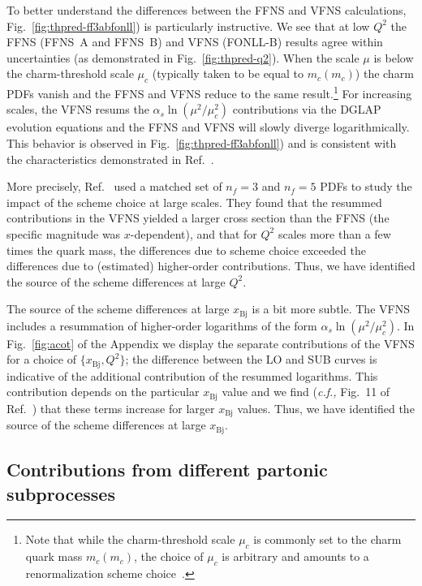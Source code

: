 \documentclass[pdftex,twocolumn,epjc3]{svjour3}          %
\newcommand{\xbj}{\ensuremath{x_{\text{Bj}}}\xspace}
\newcommand{\fonll} {{FONLL-B}\xspace}
\newcommand{\ffns} {{FFNS~A}\xspace}
\newcommand{\ffnsb} {{FFNS~B}\xspace}
\begin{document}
%
To better understand the differences between the FFNS and VFNS
calculations, Fig.~\ref{fig:thpred-ff3abfonll}) is particularly
instructive.
%
We see that at low $Q^2$ the FFNS (\ffns and \ffnsb) and VFNS
(\fonll) results agree within uncertainties (as demonstrated in 
Fig.~\ref{fig:thpred-q2}). When the scale $\mu$ is
below the charm-threshold scale $\mu_c$ (typically taken to be equal
to $m_c(m_c)$) the charm PDFs vanish and the FFNS and VFNS reduce to
the same result.\footnote{Note that while the charm-threshold scale
  $\mu_c$ is commonly set to the charm quark mass $m_c(m_c)$, the
  choice of $\mu_c$ is arbitrary and amounts to a renormalization
  scheme choice~\cite{Bertone:2017ehk}.}
%
For increasing scales, the VFNS resums the $\alpha_s\ln(\mu^2/\mu_c^2)$
contributions via the DGLAP evolution equations and the FFNS and VFNS
will slowly diverge logarithmically. This behavior is observed in
\hbox{Fig.~\ref{fig:thpred-ff3abfonll})} and is consistent with the
characteristics demonstrated in Ref.~\cite{Kusina:2013slm}.

More precisely, Ref.~\cite{Kusina:2013slm} used a matched set of
$n_f=3$ and $n_f=5$ PDFs to study the impact of the scheme choice at
large scales. They found that the resummed contributions in the VFNS
yielded a larger cross section than the FFNS (the specific magnitude
was $x$-dependent), and that for $Q^2$ scales more than a few times
the quark mass, the differences due to scheme choice exceeded the
differences due to (estimated) higher-order
contributions.
%
Thus, we have identified the source of the scheme differences at large $Q^2$.

The  source of the scheme differences at large $\xbj$ is a bit more subtle. 
The VFNS includes a resummation of higher-order logarithms of the form $\alpha_s \ln(\mu^2/\mu_c^2 )$.
In Fig.~\ref{fig:acot} of the Appendix we display the separate contributions of the VFNS for a choice of
$\{\xbj,Q^2\}$; the difference  between the LO and SUB curves is indicative of the
additional contribution of the resummed logarithms.
This contribution depends on the particular $\xbj$ value and we find
({\it c.f.,} Fig.~11 of Ref.~\cite{Kusina:2013slm})
that these terms increase for larger $\xbj$ values. 
%
Thus, we have identified the source of the scheme differences at large $\xbj$.



\subsection{Contributions from different partonic subprocesses}
\label{sec:thpred-partonic}
\end{document}
